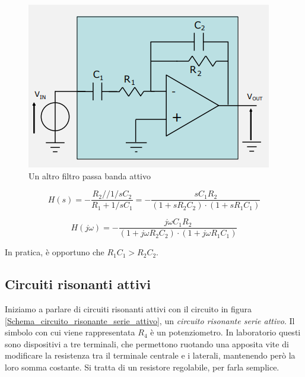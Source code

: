 \documentclass{article}
\begin{document}
\begin{figure}[h]
  \centering
  \includegraphics[scale=0.7]{IM_filtro_passa_banda_attivo_bis}
  \caption{Un altro filtro passa banda attivo}
  \label{Schema_filtro_passa_banda_attivo_bis}
\end{figure}

\[H(s) = - \frac{R_2 // 1/sC_2}{R_1 + 1/sC_1} = - \frac{s C_1 R_2}{(1 + sR_2 C_2) \cdot (1 + s R_1 C_1)}\]

\[H(j \omega) = -\frac{j \omega C_1 R_2}{(1 + j \omega R_2 C_2) \cdot (1 + j \omega R_1 C_1)}\]

In pratica, è opportuno che $R_1 C_1 > R_2 C_2$.

\clearpage














\subsection{Circuiti risonanti attivi}

Iniziamo a parlare di circuiti risonanti attivi con il circuito in figura \ref{Schema_circuito_risonante_serie_attivo}, un \textit{circuito risonante serie attivo}. Il simbolo con cui viene rappresentata $R_4$ è un potenziometro. In laboratorio questi sono dispositivi a tre terminali, che permettono ruotando una apposita vite di modificare la resistenza tra il terminale centrale e i laterali, mantenendo però la loro somma costante. Si tratta di un resistore regolabile, per farla semplice.
\end{document}
